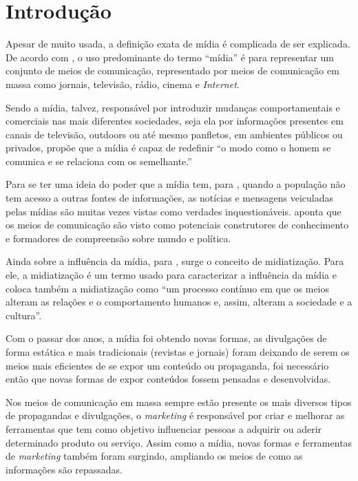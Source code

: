 \chapter[Introdução]{Introdução}
Apesar de muito usada, a definição exata de mídia é complicada de ser explicada. De acordo com \cite[p.49]{guazina2007}, o uso predominante do termo ``mídia'' é para representar um conjunto de meios de comunicação, representado por meios de comunicação em massa como jornais, televisão, rádio, cinema e \textit{Internet}.

Sendo a mídia, talvez, responsável por introduzir mudanças comportamentais e comerciais nas mais diferentes sociedades, seja ela por informações presentes em canais de televisão, outdoors ou até mesmo panfletos, em ambientes públicos ou privados, \cite[p.3]{escobar2007} propõe que a mídia é capaz de redefinir ``o modo como o homem se comunica e se relaciona com os semelhante.''

Para se ter uma ideia do poder que a mídia tem, para \cite{silva2007}, quando a população não tem acesso a outras fontes de informações, as notícias e mensagens veiculadas pelas mídias são muitas vezes vistas como verdades inquestionáveis. \cite[p.53]{guazina2007} aponta que os meios de comunicação são visto como potenciais construtores de conhecimento e formadores de compreensão sobre mundo e política.

Ainda sobre a influência da mídia, para \cite[p.54]{hjarvard2012}, surge o conceito de midiatização. Para ele, a midiatização é um termo usado para caracterizar a influência da mídia e coloca também a midiatização como ``um processo contínuo em que os meios alteram as relações e o comportamento humanos e, assim, alteram a sociedade e a cultura''. 

Com o passar dos anos, a mídia foi obtendo novas formas, as divulgações de forma estática e mais tradicionais (revistas e jornais) foram deixando de serem os meios mais eficientes de se expor um conteúdo ou propaganda, foi necessário então que novas formas de expor conteúdos fossem pensadas e desenvolvidas.

Nos meios de comunicação em massa sempre estão presente os mais diversos tipos de propagandas e divulgações, o \textit{marketing} é responsável por criar e melhorar as ferramentas que tem como objetivo influenciar pessoas a adquirir ou aderir determinado produto ou serviço. Assim como a mídia, novas formas e ferramentas de \textit{marketing} também foram surgindo, ampliando os meios de como as informações são repassadas. 

